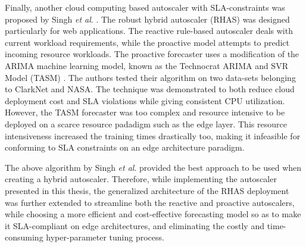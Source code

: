 Finally, another cloud computing based autoscaler with SLA-constraints was proposed by Singh \textit{et al}. \cite{singh2021rhas}. The robust hybrid autoscaler (RHAS) was designed particularly for web applications. The reactive rule-based autoscaler deals with current workload requirements, while the proactive model attempts to predict incoming resource workloads. The proactive forecaster uses a modification of the ARIMA machine learning model, known as the Technocrat ARIMA and SVR Model (TASM) \cite{singh2019tasm}. The authors tested their algorithm on two data-sets belonging to ClarkNet and NASA. The technique was demonstrated to both reduce cloud deployment cost and SLA violations while giving consistent CPU utilization. However, the TASM forecaster was too complex and resource intensive to be deployed on a scarce resource padadigm such as the edge layer. This resource intensiveness increased the training times drastically too, making it infeasible for conforming to SLA constraints on an edge architecture paradigm.\par

The above algorithm by Singh \textit{et al}. \cite{singh2021rhas} provided the best approach to be used when creating a hybrid autoscaler. Therefore, while implementing the autoscaler presented in this thesis, the generalized architecture of the RHAS deployment was further extended to streamline both the reactive and proactive autoscalers, while choosing a more efficient and cost-effective forecasting model so as to make it SLA-compliant on edge architectures, and eliminating the costly and time-consuming hyper-parameter tuning process.\par

